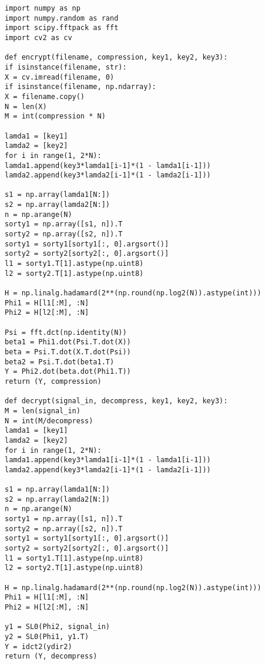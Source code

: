 \begin{lstlisting}
import numpy as np
import numpy.random as rand
import scipy.fftpack as fft
import cv2 as cv

def encrypt(filename, compression, key1, key2, key3):
if isinstance(filename, str):
X = cv.imread(filename, 0)
if isinstance(filename, np.ndarray):
X = filename.copy()
N = len(X)
M = int(compression * N)

lamda1 = [key1]
lamda2 = [key2]
for i in range(1, 2*N):
lamda1.append(key3*lamda1[i-1]*(1 - lamda1[i-1]))
lamda2.append(key3*lamda2[i-1]*(1 - lamda2[i-1]))

s1 = np.array(lamda1[N:])
s2 = np.array(lamda2[N:])
n = np.arange(N)
sorty1 = np.array([s1, n]).T
sorty2 = np.array([s2, n]).T
sorty1 = sorty1[sorty1[:, 0].argsort()]
sorty2 = sorty2[sorty2[:, 0].argsort()]
l1 = sorty1.T[1].astype(np.uint8)
l2 = sorty2.T[1].astype(np.uint8)

H = np.linalg.hadamard(2**(np.round(np.log2(N)).astype(int)))
Phi1 = H[l1[:M], :N]
Phi2 = H[l2[:M], :N]

Psi = fft.dct(np.identity(N))
beta1 = Phi1.dot(Psi.T.dot(X))
beta = Psi.T.dot(X.T.dot(Psi))
beta2 = Psi.T.dot(beta1.T)
Y = Phi2.dot(beta.dot(Phi1.T))
return (Y, compression)

def decrypt(signal_in, decompress, key1, key2, key3):
M = len(signal_in)
N = int(M/decompress)
lamda1 = [key1]
lamda2 = [key2]
for i in range(1, 2*N):
lamda1.append(key3*lamda1[i-1]*(1 - lamda1[i-1]))
lamda2.append(key3*lamda2[i-1]*(1 - lamda2[i-1]))

s1 = np.array(lamda1[N:])
s2 = np.array(lamda2[N:])
n = np.arange(N)
sorty1 = np.array([s1, n]).T
sorty2 = np.array([s2, n]).T
sorty1 = sorty1[sorty1[:, 0].argsort()]
sorty2 = sorty2[sorty2[:, 0].argsort()]
l1 = sorty1.T[1].astype(np.uint8)
l2 = sorty2.T[1].astype(np.uint8)

H = np.linalg.hadamard(2**(np.round(np.log2(N)).astype(int)))
Phi1 = H[l1[:M], :N]
Phi2 = H[l2[:M], :N]

y1 = SL0(Phi2, signal_in)
y2 = SL0(Phi1, y1.T)
Y = idct2(ydir2)
return (Y, decompress)
\end{lstlisting}


